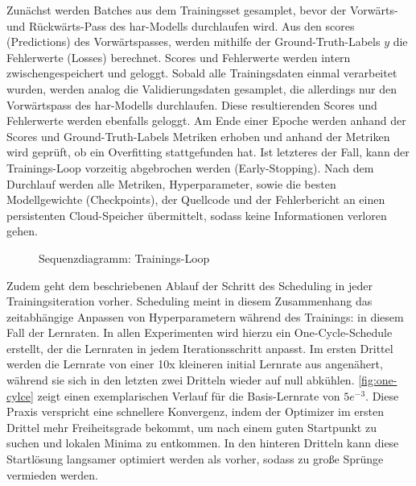 Zunächst werden Batches aus dem Trainingsset gesamplet, bevor der Vorwärts- und Rückwärts-Pass des \gls{har}-Modells durchlaufen wird.
Aus den \gls{scores} (Predictions) des Vorwärtspasses, werden mithilfe der Ground-Truth-Labels $y$ die Fehlerwerte (Losses) berechnet.
Scores und Fehlerwerte werden intern zwischengespeichert und geloggt.
Sobald alle Trainingsdaten einmal verarbeitet wurden, werden analog die Validierungsdaten gesamplet, die allerdings nur den Vorwärtspass des \gls{har}-Modells durchlaufen.
Diese resultierenden Scores und Fehlerwerte werden ebenfalls geloggt.
Am Ende einer Epoche werden anhand der Scores und Ground-Truth-Labels Metriken erhoben und anhand der Metriken wird geprüft, ob ein Overfitting stattgefunden hat.
Ist letzteres der Fall, kann der Trainings-Loop vorzeitig abgebrochen werden (Early-Stopping).
Nach dem Durchlauf werden alle Metriken, Hyperparameter, sowie die besten Modellgewichte (Checkpoints), der Quellcode und der Fehlerbericht an einen persistenten Cloud-Speicher übermittelt, sodass keine Informationen verloren gehen.

\begin{figure}[htbp!]
    \centering
    \caption{Sequenzdiagramm: Trainings-Loop}
    \label{fig:train-loop}
\end{figure}

Zudem geht dem beschriebenen Ablauf der Schritt des Scheduling in jeder Trainingsiteration vorher.
Scheduling meint in diesem Zusammenhang das zeitabhängige Anpassen von Hyperparametern während des Trainings: in diesem Fall der Lernraten.
In allen Experimenten wird hierzu ein One-Cycle-Schedule~\cite{Smith15} erstellt, der die Lernraten in jedem Iterationsschritt anpasst.
Im ersten Drittel werden die Lernrate von einer 10x kleineren initial Lernrate aus angenähert, während sie sich in den letzten zwei Dritteln wieder auf null abkühlen.
\autoref{fig:one-cylce} zeigt einen exemplarischen Verlauf für die Basis-Lernrate von $5e^{-3}$.
Diese Praxis verspricht eine schnellere Konvergenz, indem der Optimizer im ersten Drittel mehr Freiheitsgrade bekommt, um nach einem guten Startpunkt zu suchen und lokalen Minima zu entkommen.
In den hinteren Dritteln kann diese Startlösung langsamer optimiert werden als vorher, sodass zu große Sprünge vermieden werden.

